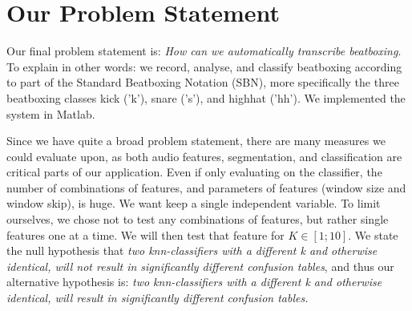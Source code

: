 \section{Our Problem Statement}
Our final problem statement is: \textit{How can we automatically transcribe beatboxing}. To explain in other words: we record, analyse, and classify beatboxing according to part of the Standard Beatboxing Notation (SBN), more specifically the three beatboxing classes kick ('k'), snare ('s'), and highhat ('hh'). We implemented the system in Matlab.

Since we have quite a broad problem statement, there are many measures we could evaluate upon, as both audio features, segmentation, and classification are critical parts of our application. Even if only evaluating on the classifier, the number of combinations of features, and parameters of features (window size and window skip), is huge. We want keep a single independent variable. To limit ourselves, we chose not to test any combinations of features, but rather single features one at a time. We will then test that feature for $K \in [1;10]$. We state the null hypothesis that \emph{two knn-classifiers with a different k and otherwise identical, will not result in significantly different confusion tables}, and thus our alternative hypothesis is: \emph{two knn-classifiers with a different k and otherwise identical, will result in significantly different confusion tables.}

